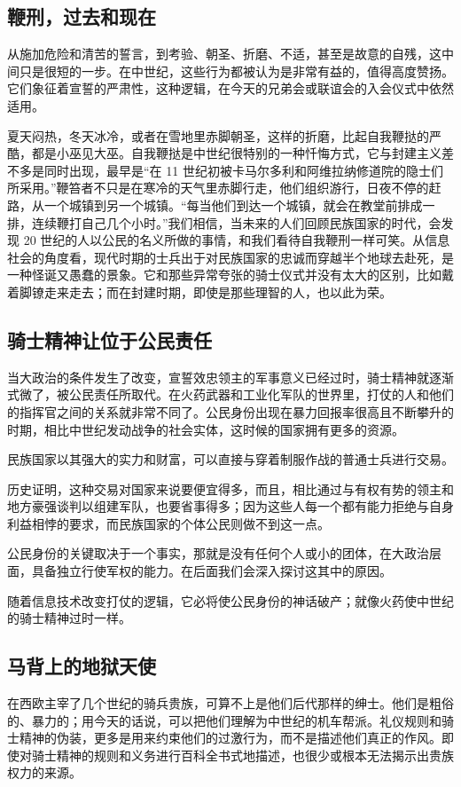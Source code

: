 \subsection{鞭刑，过去和现在}
从施加危险和清苦的誓言，到考验、朝圣、折磨、不适，甚至是故意的自残，这中间只是很短的一步。在中世纪，这些行为都被认为是非常有益的，值得高度赞扬。它们象征着宣誓的严肃性，这种逻辑，在今天的兄弟会或联谊会的入会仪式中依然适用。

夏天闷热，冬天冰冷，或者在雪地里赤脚朝圣，这样的折磨，比起自我鞭挞的严酷，都是小巫见大巫。自我鞭挞是中世纪很特别的一种忏悔方式，它与封建主义差不多是同时出现，最早是“在 11 世纪初被卡马尔多利和阿维拉纳修道院的隐士们所采用。”鞭笞者不只是在寒冷的天气里赤脚行走，他们组织游行，日夜不停的赶路，从一个城镇到另一个城镇。“每当他们到达一个城镇，就会在教堂前排成一排，连续鞭打自己几个小时。”我们相信，当未来的人们回顾民族国家的时代，会发现 20 世纪的人以公民的名义所做的事情，和我们看待自我鞭刑一样可笑。从信息社会的角度看，现代时期的士兵出于对民族国家的忠诚而穿越半个地球去赴死，是一种怪诞又愚蠢的景象。它和那些异常夸张的骑士仪式并没有太大的区别，比如戴着脚镣走来走去；而在封建时期，即使是那些理智的人，也以此为荣。

\subsection{骑士精神让位于公民责任}
当大政治的条件发生了改变，宣誓效忠领主的军事意义已经过时，骑士精神就逐渐式微了，被公民责任所取代。在火药武器和工业化军队的世界里，打仗的人和他们的指挥官之间的关系就非常不同了。公民身份出现在暴力回报率很高且不断攀升的时期，相比中世纪发动战争的社会实体，这时候的国家拥有更多的资源。

民族国家以其强大的实力和财富，可以直接与穿着制服作战的普通士兵进行交易。

历史证明，这种交易对国家来说要便宜得多，而且，相比通过与有权有势的领主和地方豪强谈判以组建军队，也要省事得多；因为这些人每一个都有能力拒绝与自身利益相悖的要求，而民族国家的个体公民则做不到这一点。

公民身份的关键取决于一个事实，那就是没有任何个人或小的团体，在大政治层面，具备独立行使军权的能力。在后面我们会深入探讨这其中的原因。

随着信息技术改变打仗的逻辑，它必将使公民身份的神话破产；就像火药使中世纪的骑士精神过时一样。

\subsection{马背上的地狱天使}
在西欧主宰了几个世纪的骑兵贵族，可算不上是他们后代那样的绅士。他们是粗俗的、暴力的；用今天的话说，可以把他们理解为中世纪的机车帮派。礼仪规则和骑士精神的伪装，更多是用来约束他们的过激行为，而不是描述他们真正的作风。即使对骑士精神的规则和义务进行百科全书式地描述，也很少或根本无法揭示出贵族权力的来源。

